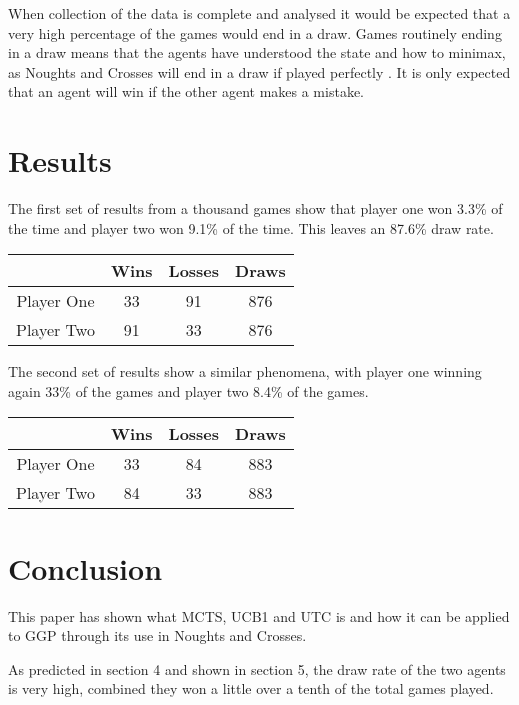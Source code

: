 \documentclass[conference]{IEEEtran}
\begin{document}
When collection of the data is complete and analysed it would be expected that a very high percentage of the games would end in a draw. Games routinely ending in a draw means that the agents have understood the state and how to minimax, as Noughts and Crosses will end in a draw if played perfectly \cite{qmuloxo}. It is only expected that an agent will win if the other agent makes a mistake.

\section{Results}
The first set of results from a thousand games show that player one won 3.3\% of the time and player two won 9.1\% of the time. This leaves an 87.6\% draw rate.

\begin{center}
	\begin{tabular}{||c c c c||}
		\hline
		 {} & Wins & Losses & Draws \\ [0.5ex] 
		\hline\hline
		Player One & 33 & 91 & 876\\
		\hline
		Player Two & 91 & 33 & 876\\
	\end{tabular}
\end{center}

The second set of results show a similar phenomena, with player one winning again 33\% of the games and player two 8.4\% of the games.

\begin{center}
	\begin{tabular}{||c c c c||}
		\hline
		{} & Wins & Losses & Draws \\ [0.5ex] 
		\hline\hline
		Player One & 33 & 84 & 883\\
		\hline
		Player Two & 84 & 33 & 883\\
	\end{tabular}
\end{center}

\section{Conclusion}
This paper has shown what MCTS, UCB1 and UTC is and how it can be applied to GGP through its use in Noughts and Crosses.

As predicted in section 4 and shown in section 5, the draw rate of the two agents is very high, combined they won a little over a tenth of the total games played.  
\end{document}
